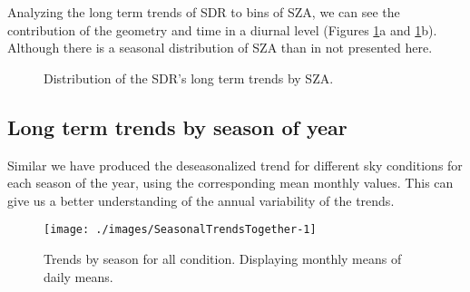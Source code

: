 \documentclass[
  preprint, 3p, authoryear]{article}
\begin{document}
Analyzing the long term trends of SDR to bins of SZA, we can see the contribution of the geometry and time in a diurnal level (Figures \ref{fig:szatrends}a and \ref{fig:szatrends}b). Although there is a seasonal distribution of SZA than in not presented here.

\begin{figure}[h!]

{\centering {}

}

\caption{Distribution of the SDR's long term trends by SZA.}\label{fig:szatrends}
\end{figure}

\hypertarget{long-term-trends-by-season-of-year}{%
\subsection{Long term trends by season of year}\label{long-term-trends-by-season-of-year}}

Similar we have produced the deseasonalized trend for different sky conditions for each season of the year, using the corresponding mean monthly values.
This can give us a better understanding of the annual variability of the trends.

\begin{figure}[h!]

{\centering \texttt{[image: ./images/SeasonalTrendsTogether-1]} 

}

\caption{Trends by season for all condition. Displaying monthly means of daily means.}\label{fig:seasonalALL}
\end{figure}
\end{document}
